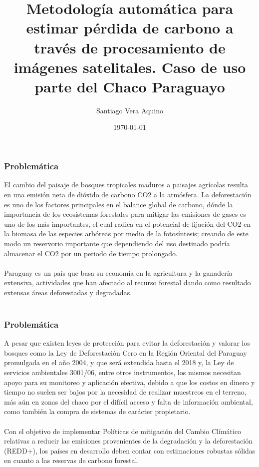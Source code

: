 \documentclass[xcolor=table]{beamer}
\title[Perdida de Carbono]{Metodolog\'ia autom\'atica para estimar p\'erdida de carbono a trav\'es de procesamiento de im\'agenes satelitales. Caso de uso parte del Chaco Paraguayo} %
\author{Santiago Vera Aquino} %
\institute[FP-UNA] %
{
Universidad Nacional de Asunci\'on \\ %
\medskip
\textit{sveraaquino@gmail.com} %
}
\date{\today} %
\begin{document}
\begin{frame}
\titlepage %
\end{frame}

\begin{frame}
\frametitle{Problem\'atica}
El cambio del paisaje de bosques tropicales maduros a paisajes agr\'icolas resulta en una emisi\'on neta de di\'oxido de carbono CO2 a la atm\'osfera. La deforestaci\'on es uno de los factores principales en el balance global de carbono, d\'onde la importancia de los ecosistemas forestales para mitigar las emisiones de gases es uno de los m\'as importantes, el cual radica en el potencial de fijaci\'on del CO2 en la biomasa de las especies arb\'oreas por medio de la fotos\'intesis; creando de este modo un reservorio importante que dependiendo del uso destinado podría almacenar el CO2 por un periodo de tiempo prolongado.\\~\\

Paraguay es un pa\'is que basa su econom\'ia en la agricultura y la ganader\'ia extensiva, actividades que han afectado al recurso forestal dando como resultado extensas \'areas deforestadas y degradadas.\\~\\

\end{frame}
\begin{frame}
	\frametitle{Problem\'atica}
	A pesar que existen leyes de protecci\'on para evitar la deforestaci\'on y valorar los bosques como la Ley de Deforestaci\'on Cero en la Regi\'on Oriental del Paraguay promulgada en el a\~{n}o 2004, y que ser\'a extendida hasta el 2018 y, la Ley de servicios ambientales 3001/06, entre otros instrumentos, los mismos necesitan apoyo para su monitoreo y aplicaci\'on efectiva, debido a que los costos en dinero y tiempo no suelen ser bajos por la necesidad de realizar muestreos en el terreno, m\'as a\'un en zonas del chaco por el dif\'icil acceso y falta de informaci\'on ambiental, como tambi\'en la compra de sistemas de car\'acter propietario.\\~\\
	
	Con el objetivo de implementar Pol\'iticas de mitigaci\'on del Cambio Cl\'im\'atico relativas a reducir las emisiones provenientes de la degradaci\'on y la deforestaci\'on (REDD+), los pa\'ises en desarrollo deben contar con estimaciones robustas s\'olidas en cuanto a las reservas de carbono forestal.
	
	
\end{frame}
\end{document}
